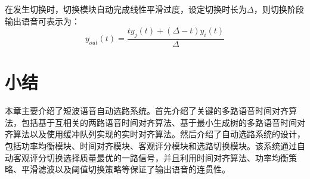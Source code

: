 在发生切换时，切换模块自动完成线性平滑过度，设定切换时长为$\Delta$，则切换阶段输出语音可表示为：
\begin{equation}
y_{out}(t) = \frac{ty_j(t)+(\Delta-t)y_i(t)}{\Delta}
\end{equation}

\section{小结}

本章主要介绍了短波语音自动选路系统。首先介绍了关键的多路语音时间对齐算法，包括基于互相关的两路语音时间对齐算法、基于最小生成树的多路语音时间对齐算法以及使用缓冲队列实现的实时对齐算法。然后介绍了自动选路系统的设计，包括功率均衡模块、时间对齐模块、客观评分模块和选路切换模块。该系统通过自动客观评分切换选择质量最优的一路信号，并且利用时间对齐算法、功率均衡策略、平滑滤波以及阈值切换策略等保证了输出语音的连贯性。
